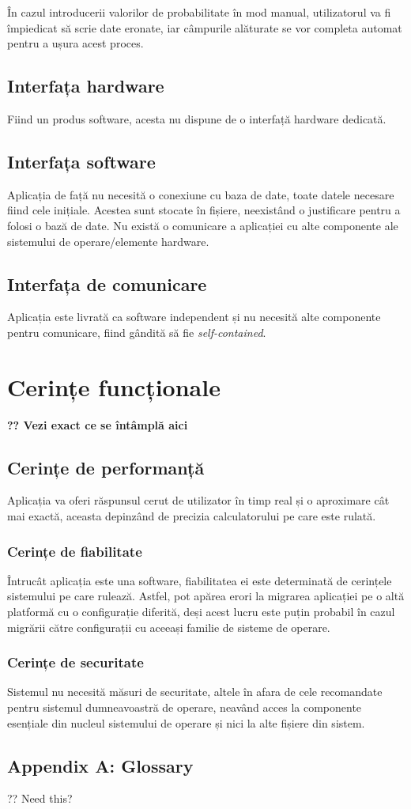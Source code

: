 \documentclass{scrreprt}
\begin{document}
În cazul introducerii valorilor de probabilitate în mod manual, utilizatorul va fi împiedicat să scrie date eronate, iar câmpurile alăturate se vor completa automat pentru a ușura acest proces.

\section{Interfața hardware}
Fiind un produs software, acesta nu dispune de o interfață hardware dedicată.

\section{Interfața software}
Aplicația de față nu necesită o conexiune cu baza de date, toate datele necesare fiind cele inițiale. Acestea sunt stocate în fișiere, neexistând o justificare pentru a folosi o bază de date. Nu există o comunicare a aplicației cu alte componente ale sistemului de operare/elemente hardware.

\section{Interfața de comunicare}
Aplicația este livrată ca software independent și nu necesită alte componente pentru comunicare, fiind gândită să fie \textit{self-contained}.

\chapter{Cerințe funcționale}
\textbf{?? Vezi exact ce se întâmplă aici}

\section{Cerințe de performanță}
Aplicația va oferi răspunsul cerut de utilizator în timp real și o aproximare cât mai exactă, aceasta depinzând de precizia calculatorului pe care este rulată.

\subsection{Cerințe de fiabilitate}
Întrucât aplicația este una software, fiabilitatea ei este determinată de cerințele sistemului pe care rulează. Astfel, pot apărea erori la migrarea aplicației pe o altă platformă cu o configurație diferită, deși acest lucru este puțin probabil în cazul migrării către configurații cu aceeași familie de sisteme de operare.

\subsection{Cerințe de securitate}
Sistemul nu necesită măsuri de securitate, altele în afara de cele recomandate pentru sistemul dumneavoastră de operare, neavând acces la componente esențiale din nucleul sistemului de operare și nici la alte fișiere din sistem.

\section{Appendix A: Glossary}
?? Need this?
\end{document}
